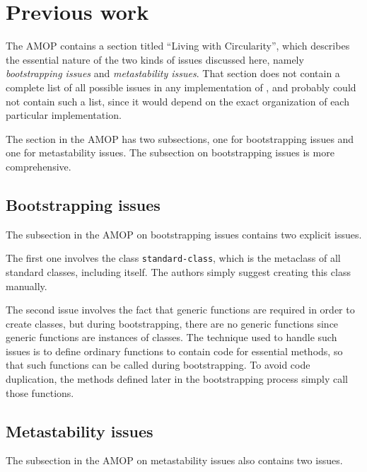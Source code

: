 \section{Previous work}

The AMOP \cite{Kiczales:1991:AMP:574212} contains a section titled
``Living with Circularity'', which describes the essential nature of
the two kinds of issues discussed here, namely \emph{bootstrapping
  issues} and \emph{metastability issues}.  That section does not
contain a complete list of all possible issues in any implementation
of \clos{}, and probably could not contain such a list, since it would
depend on the exact organization of each particular implementation.

The section in the AMOP has two subsections, one for bootstrapping
issues and one for metastability issues.  The subsection on
bootstrapping issues is more comprehensive.

\subsection{Bootstrapping issues}

The subsection in the AMOP on bootstrapping issues contains two explicit
issues.

The first one involves the class \texttt{standard-class}, which is the
metaclass of all standard classes, including itself.  The authors
simply suggest creating this class manually.

The second issue involves the fact that generic functions are required
in order to create classes, but during bootstrapping, there are no
generic functions since generic functions are instances of classes.
The technique used to handle such issues is to define ordinary
functions to contain code for essential methods, so that such
functions can be called during bootstrapping.  To avoid code
duplication, the methods defined later in the bootstrapping process
simply call those functions.

\subsection{Metastability issues} 

The subsection in the AMOP on metastability issues also contains two
issues.

